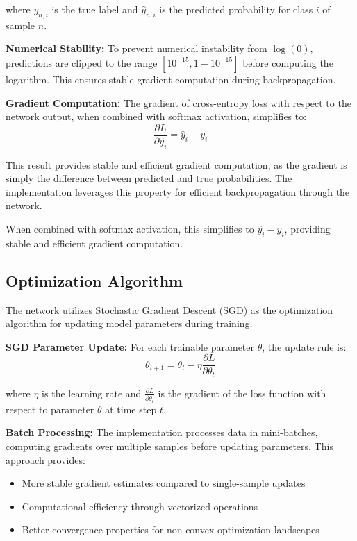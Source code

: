 \documentclass[conference]{IEEEtran}
\begin{document}
where $y_{n,i}$ is the true label and $\hat{y}_{n,i}$ is the predicted probability for class $i$ of sample $n$.

\textbf{Numerical Stability:} To prevent numerical instability from $\log(0)$, predictions are clipped to the range $[10^{-15}, 1-10^{-15}]$ before computing the logarithm. This ensures stable gradient computation during backpropagation.

\textbf{Gradient Computation:} The gradient of cross-entropy loss with respect to the network output, when combined with softmax activation, simplifies to:
\begin{equation}
\frac{\partial L}{\partial \hat{y}_i} = \hat{y}_i - y_i
\end{equation}

This result provides stable and efficient gradient computation, as the gradient is simply the difference between predicted and true probabilities. The implementation leverages this property for efficient backpropagation through the network.

When combined with softmax activation, this simplifies to $\hat{y}_i - y_i$, providing stable and efficient gradient computation.

\subsection{Optimization Algorithm}
The network utilizes Stochastic Gradient Descent (SGD) as the optimization algorithm for updating model parameters during training.

\textbf{SGD Parameter Update:} For each trainable parameter $\theta$, the update rule is:
\begin{equation}
\theta_{t+1} = \theta_t - \eta \frac{\partial L}{\partial \theta_t}
\end{equation}

where $\eta$ is the learning rate and $\frac{\partial L}{\partial \theta_t}$ is the gradient of the loss function with respect to parameter $\theta$ at time step $t$.

\textbf{Batch Processing:} The implementation processes data in mini-batches, computing gradients over multiple samples before updating parameters. This approach provides:
\begin{itemize}
\item More stable gradient estimates compared to single-sample updates
\item Computational efficiency through vectorized operations
\item Better convergence properties for non-convex optimization landscapes
\end{itemize}
\end{document}
